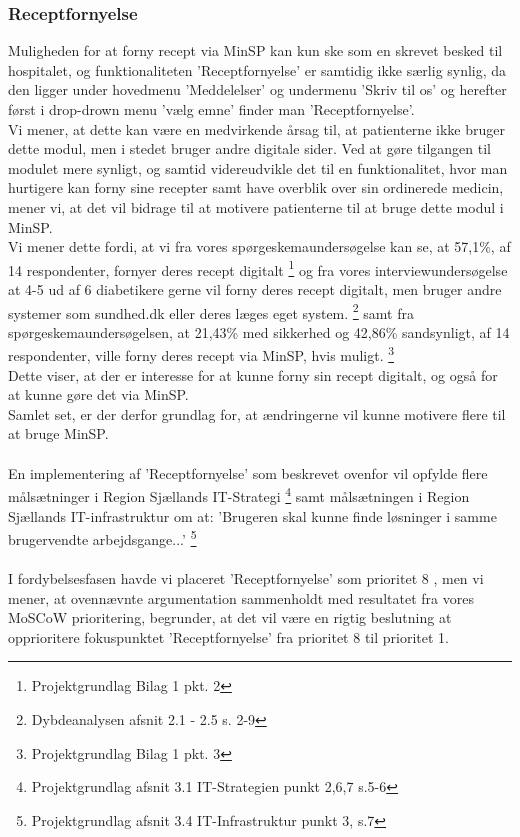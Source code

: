 \subsubsection{Receptfornyelse}
Muligheden for at forny recept via MinSP kan kun ske som en skrevet besked til hospitalet, og funktionaliteten 'Receptfornyelse' er samtidig ikke særlig synlig, da den ligger under hovedmenu 'Meddelelser' og undermenu 'Skriv til os' og herefter først i drop-drown menu 'vælg emne' finder man 'Receptfornyelse'.\\
Vi mener, at dette kan være en medvirkende årsag til, at patienterne ikke bruger dette modul, men i stedet bruger andre digitale sider. Ved at gøre tilgangen til modulet mere synligt, og samtid videreudvikle det til en funktionalitet, hvor man hurtigere kan forny sine recepter samt have overblik over sin ordinerede medicin, mener vi, at det vil bidrage til at motivere patienterne til at bruge dette modul i MinSP.\\
Vi mener dette fordi, at vi fra vores spørgeskemaundersøgelse kan se, at 57,1\%, af 14 respondenter, fornyer deres recept digitalt \footnote{Projektgrundlag Bilag 1 pkt. 2} og fra vores interviewundersøgelse at 4-5 ud af 6 diabetikere gerne vil forny deres recept digitalt, men bruger andre systemer som sundhed.dk eller deres læges eget system. \footnote{Dybdeanalysen afsnit 2.1 - 2.5 s. 2-9} samt fra spørgeskemaundersøgelsen, at 21,43\% med sikkerhed og 42,86\% sandsynligt, af 14 respondenter, ville forny deres recept via MinSP, hvis muligt. \footnote{Projektgrundlag Bilag 1 pkt. 3}  \\
Dette viser, at der er interesse for at kunne forny sin recept digitalt, og også for at kunne gøre det via MinSP.\\
Samlet set, er der derfor grundlag for, at ændringerne vil kunne motivere flere til at bruge MinSP.\\
\\
En implementering af 'Receptfornyelse' som beskrevet ovenfor vil opfylde flere målsætninger i Region Sjællands IT-Strategi \footnote{Projektgrundlag afsnit 3.1 IT-Strategien punkt 2,6,7 s.5-6} samt målsætningen i Region Sjællands IT-infrastruktur om at: 'Brugeren skal kunne finde løsninger i samme brugervendte arbejdsgange...' \footnote{Projektgrundlag afsnit 3.4 IT-Infrastruktur punkt 3, s.7}\\
\\
I fordybelsesfasen havde vi placeret 'Receptfornyelse' som prioritet 8%
, men vi mener, at ovennævnte argumentation sammenholdt med resultatet fra vores MoSCoW prioritering, begrunder, at det vil være en rigtig beslutning at opprioritere fokuspunktet 'Receptfornyelse' fra prioritet 8 til prioritet 1.
